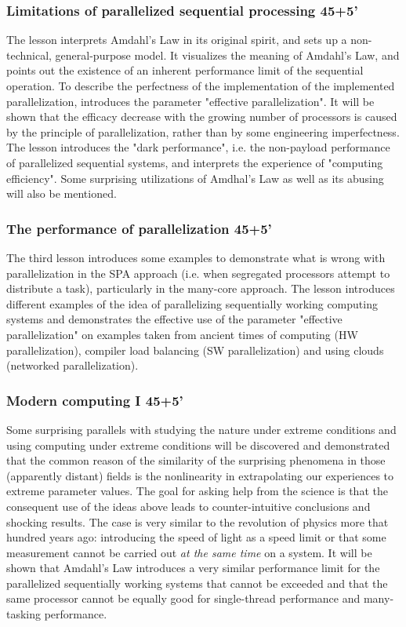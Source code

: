\documentclass[preprint,12pt,authoryear]{article}
\begin{document}
	    \subsubsection{Limitations of parallelized sequential processing 45+5'}
	    The lesson interprets Amdahl's Law in its original 
		spirit, and sets up a non-technical, general-purpose model.
		It visualizes the meaning of Amdahl's Law, and points out the existence of an inherent performance limit of the sequential operation.
		To describe the perfectness of the implementation of the implemented
		parallelization, introduces the parameter "effective parallelization".
		It will be shown that the efficacy decrease with the 
		growing number of processors is caused by the principle of
		parallelization, rather than by some engineering imperfectness.
		The lesson introduces the "dark performance",
		i.e. the non-payload performance of parallelized sequential systems,
		and interprets the experience of "computing efficiency". Some surprising utilizations of Amdhal's Law as well as its abusing will also be mentioned.
		\subsubsection{The performance of parallelization 45+5'}
		The third lesson introduces some examples to demonstrate 
		what is wrong with parallelization in the SPA approach
		(i.e. when segregated processors attempt to distribute a task),
		particularly in the many-core approach.
		The lesson introduces different examples of the idea of
		parallelizing sequentially working computing systems and demonstrates the effective use of the parameter "effective parallelization" on examples
		taken from ancient times of computing (HW parallelization), compiler load balancing (SW parallelization) and using clouds (networked parallelization).
		\subsubsection{Modern computing I 45+5'}
	    Some surprising parallels with
	    studying the nature under extreme conditions and using
	    computing under extreme conditions will be discovered and demonstrated
	    that the common reason of the similarity of the surprising
	    phenomena in those (apparently distant) fields is
	    the nonlinearity in extrapolating our experiences to 
	    extreme parameter values. The goal for asking help from the science
	    is that the consequent use of the ideas above leads to
	    counter-intuitive conclusions and shocking results.
	    The case is very similar to the revolution of physics
	    more that hundred years ago: introducing the speed of light as 
	    a speed limit or  that some measurement cannot be carried out
	    \textit{at the same time} on a system.
	    It will be shown that Amdahl's Law introduces a very similar
	    performance limit for the parallelized sequentially working systems
	    that cannot be exceeded and that the same processor cannot be
	    equally good for single-thread performance and many-tasking performance. 
	    
\end{document}
